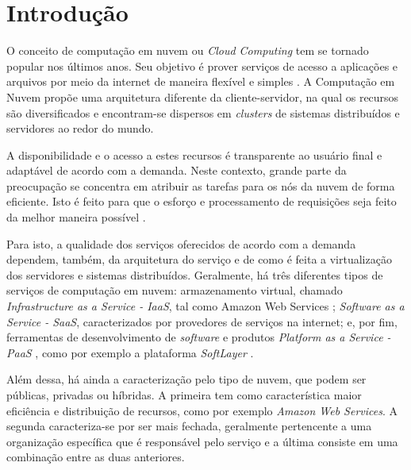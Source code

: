 \chapter{Introdução}\label{cap:introducao}

O conceito de computação em nuvem ou \textit{Cloud Computing} tem se tornado popular nos últimos anos. Seu objetivo é prover serviços de acesso a aplicações e arquivos por meio da internet de maneira flexível e simples \cite{surveycloud:2012}. A Computação em Nuvem propõe uma arquitetura diferente da cliente-servidor, na qual os recursos são diversificados e encontram-se dispersos em \textit{clusters} de sistemas distribuídos e servidores ao redor do mundo. 

A disponibilidade e o acesso a estes recursos é transparente ao usuário final e adaptável de acordo com a demanda. Neste contexto, grande parte da preocupação se concentra em atribuir as tarefas para os nós da nuvem de forma eficiente. Isto é feito para que o esforço e processamento de requisições seja feito da melhor maneira possível \cite{comparativestudy:2010}.  

Para isto, a qualidade dos serviços oferecidos de acordo com a demanda dependem, também, da arquitetura do serviço e de como é feita a virtualização dos servidores e sistemas distribuídos. Geralmente, há três diferentes tipos de serviços de computação em nuvem: armazenamento virtual, chamado \textit{Infrastructure as a Service - IaaS}, tal como Amazon Web Services \cite{amazon-cloud}; \textit{Software as a Service - SaaS}, caracterizados por provedores de serviços na internet; e, por fim, ferramentas de desenvolvimento de \textit{software} e produtos \textit{Platform as a Service - PaaS} \cite{loadbalnn}, como por exemplo a plataforma \textit{SoftLayer} \cite{softlayer2}.

Além dessa, há ainda a caracterização pelo tipo de nuvem, que podem ser públicas, privadas ou híbridas. A primeira tem como característica maior eficiência e distribuição de recursos, como por exemplo \textit{Amazon Web Services}. A segunda caracteriza-se por ser mais fechada, geralmente pertencente a uma organização específica que é responsável pelo serviço \cite{zhang2010cloud} e a última consiste em uma combinação entre as duas anteriores.


